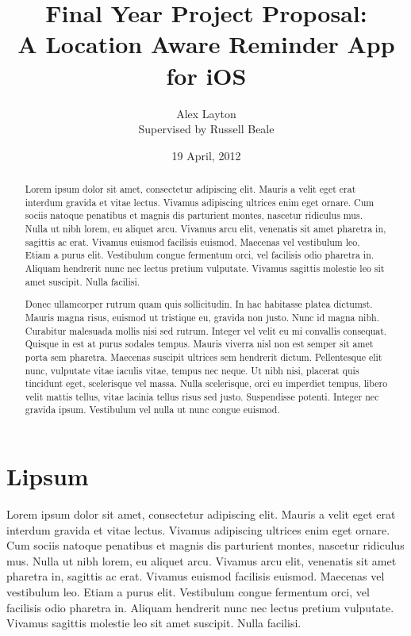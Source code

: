 \documentclass[12pt]{article}
\title{Final Year Project Proposal: \\ A Location Aware Reminder App for iOS}
\author{Alex Layton \\ Supervised by Russell Beale}
\date{19 April, 2012}
\begin{document}
\maketitle

\begin{abstract}
	Lorem ipsum dolor sit amet, consectetur adipiscing elit. Mauris a velit eget erat interdum gravida et vitae lectus. Vivamus adipiscing ultrices enim eget ornare. Cum sociis natoque penatibus et magnis dis parturient montes, nascetur ridiculus mus. Nulla ut nibh lorem, eu aliquet arcu. Vivamus arcu elit, venenatis sit amet pharetra in, sagittis ac erat. Vivamus euismod facilisis euismod. Maecenas vel vestibulum leo. Etiam a purus elit. Vestibulum congue fermentum orci, vel facilisis odio pharetra in. Aliquam hendrerit nunc nec lectus pretium vulputate. Vivamus sagittis molestie leo sit amet suscipit. Nulla facilisi.

	Donec ullamcorper rutrum quam quis sollicitudin. In hac habitasse platea dictumst. Mauris magna risus, euismod ut tristique eu, gravida non justo. Nunc id magna nibh. Curabitur malesuada mollis nisi sed rutrum. Integer vel velit eu mi convallis consequat. Quisque in est at purus sodales tempus. Mauris viverra nisl non est semper sit amet porta sem pharetra. Maecenas suscipit ultrices sem hendrerit dictum. Pellentesque elit nunc, vulputate vitae iaculis vitae, tempus nec neque. Ut nibh nisi, placerat quis tincidunt eget, scelerisque vel massa. Nulla scelerisque, orci eu imperdiet tempus, libero velit mattis tellus, vitae lacinia tellus risus sed justo. Suspendisse potenti. Integer nec gravida ipsum. Vestibulum vel nulla ut nunc congue euismod.
\end{abstract}

\section{Lipsum}
Lorem ipsum dolor sit amet, consectetur adipiscing elit. Mauris a velit eget erat interdum gravida et vitae lectus. Vivamus adipiscing ultrices enim eget ornare. Cum sociis natoque penatibus et magnis dis parturient montes, nascetur ridiculus mus. Nulla ut nibh lorem, eu aliquet arcu. Vivamus arcu elit, venenatis sit amet pharetra in, sagittis ac erat. Vivamus euismod facilisis euismod. Maecenas vel vestibulum leo. Etiam a purus elit. Vestibulum congue fermentum orci, vel facilisis odio pharetra in. Aliquam hendrerit nunc nec lectus pretium vulputate. Vivamus sagittis molestie leo sit amet suscipit. Nulla facilisi.
\end{document}
